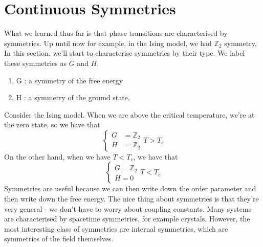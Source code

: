 \section{Continuous Symmetries} 

What we learned thus far is that 
phase transitions are characterised by symmetries. 
Up until now for example, in the Ising model, we had $ \mathbb{ Z}_ 2  $  symmetry. 
In this section, we'll start to characterise symmetries 
by their type. We label these symmetries as $ G $ and $ H $. 
\begin{enumerate}
	\item G : a symmetry of the free energy 
	\item H : a symmetry of the ground state. 
\end{enumerate} 
Consider the Ising model. 
When we are above the critical temperature, we're 
at the zero state, so we have that 
\[
 \begin{cases}
	 G & = \mathbb{ Z} _ 2 \\
	 H & = \mathbb{ Z} _ 2 
 \end{cases}
 T > T _ c 
\] On the other hand, when we 
have $ T < T _ c$, we have that 
\[
 \begin{cases}
	 G = \mathbb{ Z} _ 2 \\
	 H = 0 
 \end{cases}
 T <  T _ c 
\]
Symmetries are useful because we can then write down the order parameter
and then write down the free energy. The nice
thing about symmetries is that they're very general  - we don't have
to worry about coupling constants. 
Many systems are characterised by spacetime symmetries, for example crystals. 
However, the most interesting class of symmetries 
are internal symmetries, which are symmetries of the field themselves. 

